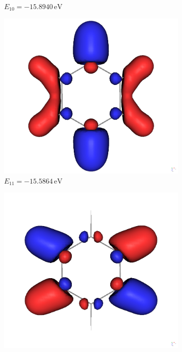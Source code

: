 \documentclass[9pt]{report}
\begin{document}
\begin{figure}[H]
\begin{subfigure}[b]{0.23\textwidth}
		\caption[]{{\small $E_{10}=-15.8940\,\mathrm{eV}$}}    
	\end{subfigure}
	\begin{subfigure}[b]{0.23\textwidth}   
		\centering 
		\includegraphics[width=\textwidth]{Benzol-11.png}
		\caption[]{{\small $E_{11}=-15.5864\,\mathrm{eV}$}}    
	\end{subfigure}
	\hfill
	\begin{subfigure}[b]{0.23\textwidth}   
		\centering 
		\includegraphics[width=\textwidth]{Benzol-12.png}

\end{subfigure}
\end{figure}
\end{document}
